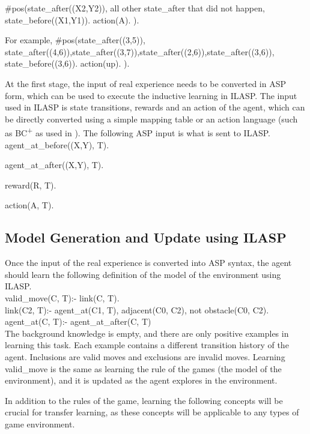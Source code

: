 #pos({state_after((X2,Y2))}, {all other state_after that did not happen}, {state_before((X1,Y1)). action(A). }).

For example, 
#pos({state_after((3,5))}, {state_after((4,6)),state_after((3,7)),state_after((2,6)),state_after((3,6))}, {state_before((3,6)). action(up). }).

At the first stage,  the input of real experience needs to be converted in ASP form, which can be used to execute the inductive learning in ILASP. The input used in ILASP is state transitions, 
rewards and an action of the agent, which can be directly converted using a simple mapping table or an action language (such as BC\textsuperscript{+} as used in \cite{Ferreira2017}). 
The following ASP input is what is sent to ILASP. \\

agent\_at\_before((X,Y), T).

agent\_at\_after((X,Y), T).

reward(R, T).

action(A, T).

\subsection{Model Generation and Update using ILASP}
\label{model_generation_and_update}
Once the input of the real experience is converted into ASP syntax, the agent should learn the following definition of the model of the environment using ILASP. \\

valid\_move(C, T):- link(C, T).
\\
link(C2, T):- agent\_at(C1, T), adjacent(C0, C2), not obstacle(C0, C2).\\
agent\_at(C, T):- agent\_at\_after(C, T) \\

The background knowledge is empty, and there are only positive examples in learning this task. Each example contains a different transition history of the agent. Inclusions are valid moves and exclusions are invalid moves. Learning valid\_move is the same as learning the rule of the games (the model of the environment), and it is updated as the agent explores in the environment.

In addition to the rules of the game, learning the following concepts will be crucial for transfer learning, as these concepts will be applicable to any types of game environment.  \\

